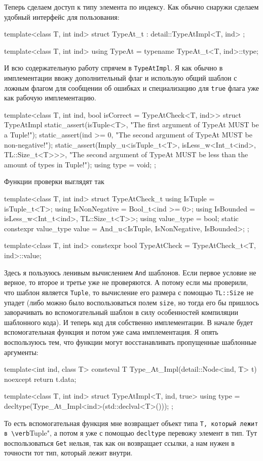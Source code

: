 Теперь сделаем доступ к типу элемента по индексу.
Как обычно снаружи сделаем удобный интерфейс для пользования:
\begin{cppcode}
template<class T, int ind>
struct TypeAt_t : detail::TypeAtImpl<T, ind> {};

template<class T, int ind>
using TypeAt = typename TypeAt_t<T, ind>::type;
\end{cppcode}
И всю содержательную работу спрячем в \verb"TypeAtImpl".
Я как обычно в имплементации ввожу дополнительный флаг и использую общий шаблон с ложным флагом для сообщении об ошибках и специализацию для \verb"true" флага уже как рабочую имплементацию.
\begin{cppcode}
template<class T, int ind, bool isCorrect = TypeAtCheck<T, ind>>
struct TypeAtImpl {
  static_assert(isTuple<T>, "The first argument of TypeAt MUST be a Tuple!");
  static_assert(ind >= 0, "The second argument of TypeAt MUST be non-negative!");
  static_assert(Imply_u<isTuple_t<T>, isLess_w<Int_t<ind>, TL::Size_t<T>>>,
               "The second argument of TypeAt MUST be less than the amount of types in Tuple!");
  using type = void;
};
\end{cppcode}
Функции проверки выглядят так
\begin{cppcode}
template<class T, int ind>
struct TypeAtCheck_t {
  using IsTuple = isTuple_t<T>;
  using IsNonNegative = Bool_t<ind >= 0>;
  using IsBounded = isLess_w<Int_t<ind>, TL::Size_t<T>>;
  using value_type = bool;
  static constexpr value_type value = And_u<IsTuple, IsNonNegative, IsBounded>;
};

template<class T, int ind>
constexpr bool TypeAtCheck = TypeAtCheck_t<T, ind>::value;
\end{cppcode}
Здесь я пользуюсь ленивым вычислением \verb"And" шаблонов.
Если первое условие не верное, то второе и третье уже не проверяются.
А потому если мы проверили, что шаблон является \verb"Tuple", то вычисление его размера с помощью \verb"TL::Size" не упадет (либо можно было воспользоваться полем \verb"size", но тогда его бы пришлось заворачивать во вспомогательный шаблон в силу особенностей компиляции шаблонного кода).
И теперь код для собственно имплементации.
В начале будет вспомогательная функция и потом уже сама имплементация.
Я опять воспользуюсь тем, что функции могут восстанавливать пропущенные шаблонные аргументы:
\begin{cppcode}
template<int ind, class T>
consteval T Type_At_Impl(detail::Node<ind, T> t) noexcept {
  return t.data;
}

template<class T, int ind>
struct TypeAtImpl<T, ind, true> {
  using type = decltype(Type_At_Impl<ind>(std::declval<T>()));
};
\end{cppcode}
То есть вспомогательная функция мне возвращает объект типа \verb"T, который лежит в \verb"Tuple", а потом я уже с помощью \verb"decltype" перевожу элемент в тип.
Тут воспользоваться \verb"Get" нельзя, так как он возвращает ссылки, а нам нужен в точности тот тип, который лежит внутри.

